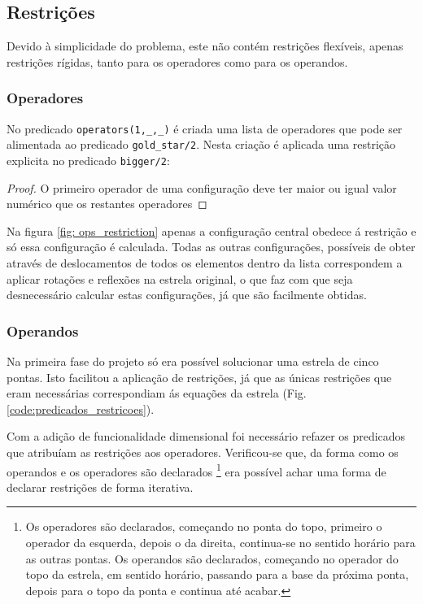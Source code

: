 \subsection{Restrições}

Devido à simplicidade do problema, este não contém restrições flexíveis, apenas restrições rígidas, tanto para os operadores como para os operandos.


\subsubsection{Operadores} No predicado \verb|operators(1,_,_)| é criada uma lista de operadores que pode ser alimentada ao predicado \verb|gold_star/2|. Nesta criação é aplicada uma restrição explicita no predicado \verb|bigger/2|:

\begin{proof}
O primeiro operador de uma configuração deve ter maior ou igual valor numérico que os restantes operadores
\end{proof}



Na figura \ref{fig: ops_restriction} apenas a configuração central obedece á restrição e só essa configuração é calculada. Todas as outras configurações, possíveis de obter através de deslocamentos de todos os elementos dentro da lista correspondem a aplicar rotações e reflexões na estrela original, o que faz com que seja desnecessário calcular estas configurações, já que são facilmente obtidas.




\subsubsection{Operandos} Na primeira fase do projeto só era possível solucionar uma estrela de cinco pontas. Isto facilitou a aplicação de restrições, já que as únicas restrições que eram necessárias correspondiam ás equações da estrela (Fig. \ref{code:predicados_restricoes}).

Com a adição de funcionalidade dimensional foi necessário refazer os predicados que atribuíam as restrições aos operadores. Verificou-se que, da forma como os operandos e os operadores são declarados \footnote{Os operadores são declarados, começando no ponta do topo, primeiro o operador da esquerda, depois o da direita, continua-se no sentido horário para as outras pontas. Os operandos são declarados, começando no operador do topo da estrela, em sentido horário, passando para a base da próxima ponta, depois para o topo da ponta e continua até acabar.} era possível achar uma forma de declarar restrições de forma iterativa.


